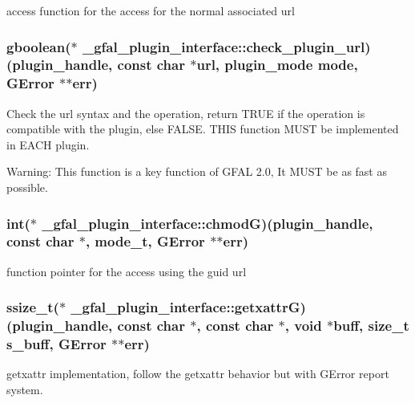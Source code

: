 access function for the access for the normal associated url 
\subsubsection{\setlength{\rightskip}{0pt plus 5cm}gboolean($\ast$ \bf{\_\-gfal\_\-plugin\_\-interface::check\_\-plugin\_\-url})(plugin\_\-handle, const char $\ast$url, plugin\_\-mode mode, GError $\ast$$\ast$err)}\label{struct__gfal__plugin__interface_e1ab2d2c3ea35095446a2c14734b5f4c}


Check the url syntax and the operation, return TRUE if the operation is compatible with the plugin, else FALSE. THIS function MUST be implemented in EACH plugin. \begin{Desc}
\item[Warning:]This function is a key function of GFAL 2.0, It MUST be as fast as possible. \end{Desc}
\subsubsection{\setlength{\rightskip}{0pt plus 5cm}int($\ast$ \bf{\_\-gfal\_\-plugin\_\-interface::chmod\-G})(plugin\_\-handle, const char $\ast$, mode\_\-t, GError $\ast$$\ast$err)}\label{struct__gfal__plugin__interface_e032ec6f13423ea516ca4c02332f5ecf}


function pointer for the access using the guid url 
\subsubsection{\setlength{\rightskip}{0pt plus 5cm}ssize\_\-t($\ast$ \bf{\_\-gfal\_\-plugin\_\-interface::getxattr\-G})(plugin\_\-handle, const char $\ast$, const char $\ast$, void $\ast$buff, size\_\-t s\_\-buff, GError $\ast$$\ast$err)}\label{struct__gfal__plugin__interface_9c6b4405f17d92e42aa40ff307188701}


getxattr implementation, follow the getxattr behavior but with GError report system. 
